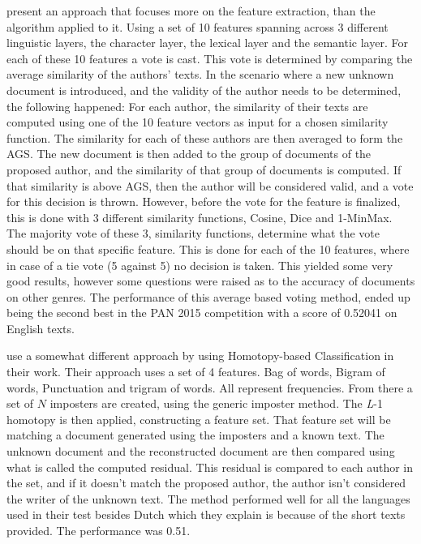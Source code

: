 \cite{castro2015Paper} present an approach that focuses more on the feature
extraction, than the algorithm applied to it. Using a set of 10 features
spanning across 3 different linguistic layers, the character layer, the lexical
layer and the semantic layer. For each of these 10 features a vote is cast. This
vote is determined by comparing the average similarity of the authors' texts.
In the scenario where a new unknown document is introduced, and the validity of
the author needs to be determined, the following happened: For each author, the
similarity of their texts are computed using one of the 10 feature vectors as
input for a chosen similarity function. The similarity for each of these authors
are then averaged to form the \gls{AGS}. The new document is then added to the
group of documents of the proposed author, and the similarity of that group of
documents is computed. If that similarity is above \gls{AGS}, then the author
will be considered valid, and a vote for this decision is thrown. However,
before the vote for the feature is finalized, this is done with 3 different
similarity functions, Cosine, Dice and 1-MinMax. The majority vote of these
3, similarity functions, determine what the vote should be on that specific
feature. This is done for each of the 10 features, where in case of a tie vote
(5 against 5) no decision is taken. This yielded some very good results, however
some questions were raised as to the accuracy of documents on other genres. The
performance of this average based voting method, ended up being the second best
in the PAN 2015 competition with a score of 0.52041 on English texts.

\cite{gutierrez2015} use a somewhat different approach by using Homotopy-based
Classification in their work. Their approach uses a set of 4 features. Bag
of words, Bigram of words, Punctuation and trigram of words. All represent
frequencies. From there a set of $N$ imposters are created, using the generic
imposter method. The \textit{L}-1 homotopy is then applied, constructing a
feature set. That feature set will be matching a document generated using the
imposters and a known text. The unknown document and the reconstructed document
are then compared using what is called the computed residual. This residual
is compared to each author in the set, and if it doesn't match the proposed
author, the author isn't considered the writer of the unknown text. The method
performed well for all the languages used in their test besides
Dutch which they explain is because of the short texts provided. The performance
was 0.51.

